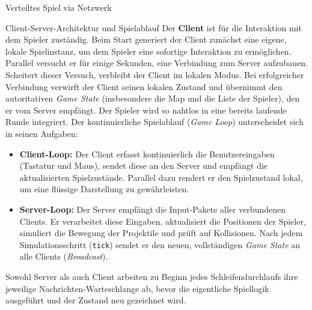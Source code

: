 \begin{section}{Verteiltes Spiel via Netzwerk}
\begin{subsection}{Client-Server-Architektur und Spielablauf}
Der \textbf{Client} ist für die Interaktion mit dem Spieler zuständig.
Beim Start generiert der Client zunächst eine eigene, lokale Spielinstanz, um dem Spieler eine sofortige Interaktion zu ermöglichen.
Parallel versucht er für einige Sekunden, eine Verbindung zum Server aufzubauen.
Scheitert dieser Versuch, verbleibt der Client im lokalen Modus.
Bei erfolgreicher Verbindung verwirft der Client seinen lokalen Zustand und übernimmt den autoritativen \emph{Game State} (insbesondere die Map und die Liste der Spieler), den er vom Server empfängt.
Der Spieler wird so nahtlos in eine bereits laufende Runde integriert.
Der kontinuierliche Spielablauf (\emph{Game Loop}) unterscheidet sich in seinen Aufgaben:
\begin{itemize}
    \item \textbf{Client-Loop:} Der Client erfasst kontinuierlich die Benutzereingaben (Tastatur und Maus), sendet diese an den Server und empfängt die aktualisierten Spielzustände.
Parallel dazu rendert er den Spielzustand lokal, um eine flüssige Darstellung zu gewährleisten.
\item \textbf{Server-Loop:} Der Server empfängt die Input-Pakete aller verbundenen Clients.
Er verarbeitet diese Eingaben, aktualisiert die Positionen der Spieler, simuliert die Bewegung der Projektile und prüft auf Kollisionen.
Nach jedem Simulationsschritt (\texttt{tick}) sendet er den neuen, vollständigen \emph{Game State} an alle Clients (\emph{Broadcast}).
\end{itemize}
Sowohl Server als auch Client arbeiten zu Beginn jedes Schleifendurchlaufs ihre jeweilige Nachrichten-Warteschlange ab, bevor die eigentliche Spiellogik ausgeführt und der Zustand neu gezeichnet wird.
\end{subsection}


\end{section}
